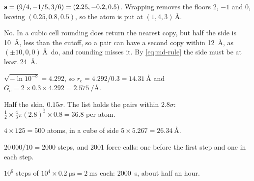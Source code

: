 \label{sec:md-answers}

$\bm{\mathrm{s}} = (9/4, -1/5, 3/6) = (2.25, -0.2,
0.5)$. Wrapping removes the floors 2, $-1$ and 0, leaving $(0.25, 0.8,
0.5)$, so the atom is put at $(1, 4, 3)$\,\AA.

No. In a cubic cell rounding does return the
nearest copy, but half the side is \SI{10}{\angstrom}, less than the
cutoff, so a pair can have a second copy within \SI{12}{\angstrom}, as
$(\pm10, 0, 0)$\,\AA\ do, and rounding misses it. By \cref{eq:md-rule}
the side must be at least \SI{24}{\angstrom}.

$\sqrt{-\ln10^{-8}} = 4.292$, so $r_{\mathrm c} =
4.292/0.3 = \SI{14.31}{\angstrom}$ and $G_{\mathrm c} = 2\times0.3\times
4.292 = \SI{2.575}{\per\angstrom}$.

Half the skin, $0.15\sigma$. The list holds the
pairs within $2.8\sigma$: $\frac12\times\frac43\pi(2.8)^3\times0.8 = 36.8$
per atom.

$4\times125 = 500$ atoms, in a cube of side
$5\times5.267 = \SI{26.34}{\angstrom}$.

$20\,000/10 = 2000$ steps, and 2001 force calls:
one before the first step and one in each step.

$10^6$ steps of $10^4\times\SI{0.2}{\micro\second}
= \SI{2}{\milli\second}$ each: \SI{2000}{\second}, about half an hour.
